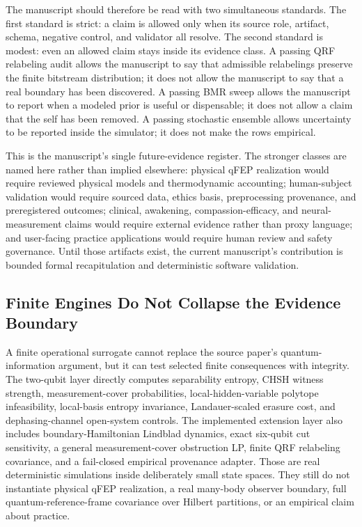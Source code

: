 \documentclass[
]{article}
\begin{document}
The manuscript should therefore be read with two simultaneous standards.
The first standard is strict: a claim is allowed only when its source
role, artifact, schema, negative control, and validator all resolve. The
second standard is modest: even an allowed claim stays inside its
evidence class. A passing QRF relabeling audit allows the manuscript to
say that admissible relabelings preserve the finite bitstream
distribution; it does not allow the manuscript to say that a real
boundary has been discovered. A passing BMR sweep allows the manuscript
to report when a modeled prior is useful or dispensable; it does not
allow a claim that the self has been removed. A passing stochastic
ensemble allows uncertainty to be reported inside the simulator; it does
not make the rows empirical.

This is the manuscript's single future-evidence register. The stronger
classes are named here rather than implied elsewhere: physical qFEP
realization would require reviewed physical models and thermodynamic
accounting; human-subject validation would require sourced data, ethics
basis, preprocessing provenance, and preregistered outcomes; clinical,
awakening, compassion-efficacy, and neural-measurement claims would
require external evidence rather than proxy language; and user-facing
practice applications would require human review and safety governance.
Until those artifacts exist, the current manuscript's contribution is
bounded formal recapitulation and deterministic software validation.

\subsection{Finite Engines Do Not Collapse the Evidence
Boundary}\label{sec:discussion-finite-engine-limits}

A finite operational surrogate cannot replace the source paper's
quantum-information argument, but it can test selected finite
consequences with integrity. The two-qubit layer directly computes
separability entropy, CHSH witness strength, measurement-cover
probabilities, local-hidden-variable polytope infeasibility, local-basis
entropy invariance, Landauer-scaled erasure cost, and dephasing-channel
open-system controls. The implemented extension layer also includes
boundary-Hamiltonian Lindblad dynamics, exact six-qubit cut sensitivity,
a general measurement-cover obstruction LP, finite QRF relabeling
covariance, and a fail-closed empirical provenance adapter. Those are
real deterministic simulations inside deliberately small state spaces.
They still do not instantiate physical qFEP realization, a real
many-body observer boundary, full quantum-reference-frame covariance
over Hilbert partitions, or an empirical claim about practice.
\end{document}
